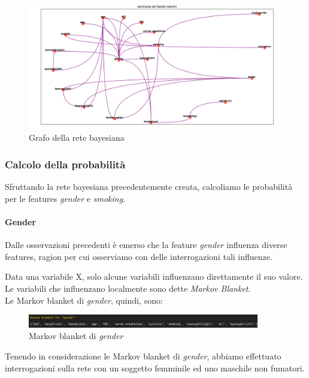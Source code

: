 \documentclass{article}
\begin{document}
\begin{figure}[H]
        \includegraphics[width=16.5cm]{rete}
        \centering
        \caption{Grafo della rete bayesiana}
        \centering
\end{figure}
%


\subsubsection{Calcolo della probabilità}

Sfruttando la rete bayesiana precedentemente creata, calcoliamo le probabilità per le features \textit{gender} e \textit{smoking}.

\paragraph{Gender}
Dalle osservazioni precedenti è emerso che la feature \textit{gender} influenza diverse features, ragion per cui osserviamo con delle interrogazioni tali influenze.

\noindent
Data una variabile X, solo alcune variabili influenzano direttamente il suo valore.\\Le variabili che influenzano localmente sono dette \textit{Markov Blanket}.\\
Le Markov blanket di \textit{gender}, quindi, sono:

\begin{figure}[H]
        \includegraphics[width=0.9\textwidth]{MARKgen}
        \centering
        \caption{Markov blanket di \textit{gender}}
        \centering
\end{figure}

Tenendo in considerazione le Markov blanket di \textit{gender}, abbiamo effettuato interrogazioni sulla rete con un soggetto femminile ed uno maschile non fumatori. 
\end{document}
